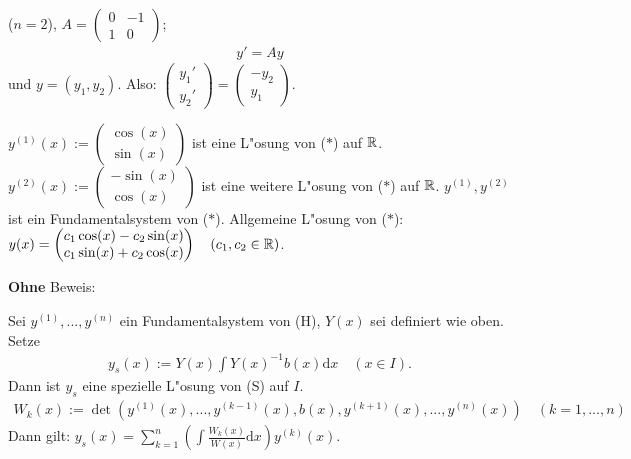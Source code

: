 \documentclass[a4paper,twoside,DIV15,BCOR12mm,chapterprefix=true,headings=twolinechapter]{scrbook}
\begin{document}
\begin{beispiel} ($n=2$), $A = \begin{pmatrix} 0 & -1 \\ 1 & 0 \end{pmatrix}$;
\begin{align*}
\tag{$*$} y' = Ay
\end{align*}
und $y = (y_1, y_2)$. Also: $\begin{pmatrix} y_1' \\ y_2' \end{pmatrix} = \begin{pmatrix} -y_2 \\ y_1 \end{pmatrix}$.

$y^{(1)}(x) := \begin{pmatrix} \cos(x) \\ \sin(x) \end{pmatrix}$ ist eine L"osung von ($*$) auf $\mathbb{R}$.
$y^{(2)}(x) := \begin{pmatrix} -\sin(x) \\ \cos(x) \end{pmatrix}$ ist eine weitere L"osung von ($*$) auf $\mathbb{R}$.
$y^{(1)}, y^{(2)}$ ist ein Fundamentalsystem von ($*$).
Allgemeine L"osung von ($*$): $y(x) = \begin{pmatrix} c_1 \cos(x) - c_2 \sin(x) \\ c_1 \sin(x) + c_2 \cos(x) \end{pmatrix}\quad (c_1, c_2 \in \mathbb{R})$.

\end{beispiel}

\textbf{Ohne} Beweis:

\begin{satz}
Sei $y^{(1)}, ..., y^{(n)}$ ein Fundamentalsystem von (H), $Y(x)$ sei definiert wie oben. Setze
\begin{align*}
y_s(x) := Y(x) \int Y(x)^{-1} b(x) \text{d}x \quad (x \in I).
\end{align*}
Dann ist $y_s$ eine spezielle L"osung von (S) auf $I$.
\begin{align*}
W_k(x) := \det \left( y^{(1)}(x), ..., y^{(k-1)}(x), b(x), y^{(k+1)}(x), ..., y^{(n)}(x) \right)\quad (k=1,...,n)
\end{align*}
Dann gilt: $y_s(x) = \sum_{k=1}^n \left( \int \frac{W_k(x)}{W(x)} \text{d}x\right) y^{(k)}(x)$.
\end{satz}
\end{document}
